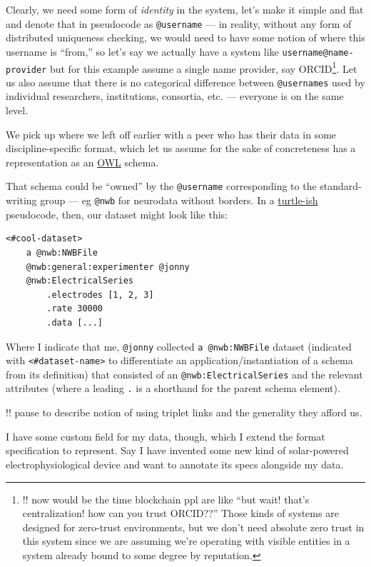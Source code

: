 \documentclass[10pt]{article}
\begin{document}
\begin{multicols}{2}
Clearly, we need some form of \emph{identity} in the system, let's make
it simple and flat and denote that in pseudocode as \texttt{@username}
--- in reality, without any form of distributed uniqueness checking, we
would need to have some notion of where this username is ``from,'' so
let's say we actually have a system like \texttt{username@name-provider}
but for this example assume a single name provider, say
ORCID\footnote{!! now would be the time blockchain ppl are like ``but
  wait! that's centralization! how can you trust ORCID??'' Those kinds
  of systems are designed for zero-trust environments, but we don't need
  absolute zero trust in this system since we are assuming we're
  operating with visible entities in a system already bound to some
  degree by reputation.}. Let us also assume that there is no
categorical difference between \texttt{@usernames} used by individual
researchers, institutions, consortia, etc. --- everyone is on the same
level.

We pick up where we left off earlier with a peer who has their data in
some discipline-specific format, which let us assume for the sake of
concreteness has a representation as an
\href{https://www.w3.org/OWL/}{OWL} schema.

That schema could be ``owned'' by the \texttt{@username} corresponding
to the standard-writing group --- eg \texttt{@nwb} for neurodata without
borders. In a \href{https://www.w3.org/TR/turtle/}{turtle-ish}
pseudocode, then, our dataset might look like this:

\begin{verbatim}
<#cool-dataset>
    a @nwb:NWBFile
    @nwb:general:experimenter @jonny
    @nwb:ElectricalSeries
        .electrodes [1, 2, 3]
        .rate 30000
        .data [...]
\end{verbatim}

Where I indicate that me, \texttt{@jonny} collected
\texttt{a\ @nwb:NWBFile} dataset (indicated with
\texttt{\textless{}\#dataset-name\textgreater{}} to differentiate an
application/instantiation of a schema from its definition) that
consisted of an \texttt{@nwb:ElectricalSeries} and the relevant
attributes (where a leading \texttt{.} is a shorthand for the parent
schema element).

!! pause to describe notion of using triplet links and the generality
they afford us.

I have some custom field for my data, though, which I extend the format
specification to represent. Say I have invented some new kind of
solar-powered electrophysiological device and want to annotate its specs
alongside my data.


\end{multicols}
\end{document}

